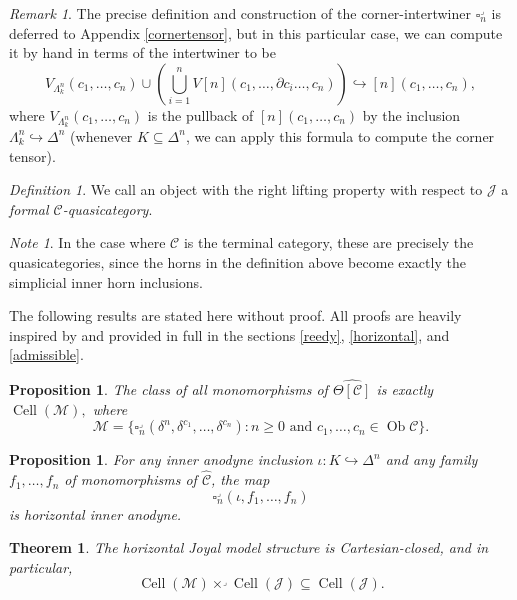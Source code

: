 \documentclass[leqno]{article}
\numberwithin{equation}{subsection}
\theoremstyle{plain}   %
\newtheorem{thm}[equation]{Theorem}
\newtheorem{prop}[equation]{Proposition}
\theoremstyle{remark}
\newtheorem{rem}[equation]{Remark}
\newtheorem{note}[equation]{Note}
\newtheorem{defn}[equation]{Definition}
\theoremstyle{plain}
\DeclareMathOperator{\Ob}{Ob}
\newcommand{\psh}[1]{\ensuremath{\widehat{#1}}}
\newcommand{\C}{\ensuremath{\mathcal{C}}}
\newcommand{\cellset}{\ensuremath{\widehat{\Theta[\mathcal{C}]}}}
\begin{document}
\begin{rem}
	The precise definition and construction of the corner-intertwiner \(\square^\lrcorner_n\) is deferred to Appendix \ref{cornertensor}, but in this particular case, we can compute it by hand in terms of the intertwiner to be \[V_{\Lambda^n_k}(c_1,\dots,c_n) \cup \left(\bigcup_{i=1}^n V[n](c_1,\dots,\partial c_i \dots, c_n) \right) \hookrightarrow [n](c_1,\dots,c_n),\] where \(V_{\Lambda^n_k}(c_1,\dots,c_n)\) is the pullback of \([n](c_1,\dots,c_n)\) by the inclusion \(\Lambda^n_k\hookrightarrow \Delta^n\) (whenever \(K\subseteq \Delta^n\), we can apply this formula to compute the corner tensor).
\end{rem}

\begin{defn}
	We call an object with the right lifting property with respect to \(\mathscr{J}\) a \emph{formal \(\C\)-quasicategory}.
\end{defn}

\begin{note} 
	In the case where \(\C\) is the terminal category, these are precisely the quasicategories, since the horns in the definition above become exactly the simplicial inner horn inclusions.
\end{note}

The following results are stated here without proof.  All proofs are heavily inspired by \cite{oury} and provided in full in the sections \ref{reedy}, \ref{horizontal}, and \ref{admissible}.

\begin{prop}
	The class of all monomorphisms of \(\cellset\) is exactly \(\operatorname{Cell}(\mathscr{M}),\) where \[\mathscr{M}=\{\square_n^\lrcorner(\delta^n,\delta^{c_1},\dots,\delta^{c_n}) : n\geq 0 \text{ and } c_1,\dots,c_n \in \Ob \C\}.\]
\end{prop}

\begin{prop}
	For any inner anodyne inclusion \(\iota:K\hookrightarrow \Delta^n\) and any family \(f_1,\dots,f_n\) of monomorphisms of \(\psh{\C}\), the map \[\square^\lrcorner_n(\iota,f_1,\dots,f_n)\] is horizontal inner anodyne.
\end{prop}

\begin{thm} The horizontal Joyal model structure is Cartesian-closed, and in particular, \[\operatorname{Cell}(\mathscr{M})\times^\lrcorner \operatorname{Cell}(\mathscr{J}) \subseteq \operatorname{Cell}(\mathscr{J}).\]
\end{thm}
\end{document}
